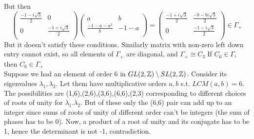 \documentclass[a4paper]{article}
\begin{document}
    But then 
    $$\begin{pmatrix}
    \frac{-1-i\sqrt{3}}{2} & 0 \\ 
    0 &  \frac{-1+i\sqrt{3}}{2}\\
    \end{pmatrix} \begin{pmatrix}
    a & b \\ 
    \frac{-1-a-a^2}{b} & -1-a \\
    \end{pmatrix} = \begin{pmatrix}
    \frac{-1+i\sqrt{3}}{2} & \frac{-b-b i\sqrt{3}}{2} \\ 
    0 & \frac{-1-i\sqrt{3}}{2} \\
    \end{pmatrix} \in \Gamma_+$$
    But it doesn't satisfy these conditions.
    Similarly matrix with non-zero left down entry cannot exist, so all elements of $\Gamma_+$ are diagonal, and $\Gamma_+ \cong C_3$
    \clm If $C_6 \in \Gamma$, then $C_6\in \Gamma_+$\\
    
    Suppose we had an element of order 6 in $GL(2,\mathbb{Z})\setminus SL(2,\mathbb{Z})$. Consider its eigenvalues $\lambda_1,\lambda_2$. Let them have multiplicative orders $a,b$ s.t. $LCM(a,b)=6$. The possibilities are (1,6),(2,6),(3,6),(6,6),(2,3) corresponding to different choices of roots of unity for  $\lambda_1.\lambda_2$. But of these only the (6,6) pair can add up to an integer since sums of roots of unity of different order can't be integers (the sum of phases has to be 0). Now, a product of a root of unity and its conjugate has to be 1, hence the determinant is not -1, contradiction.
    
\end{document}
